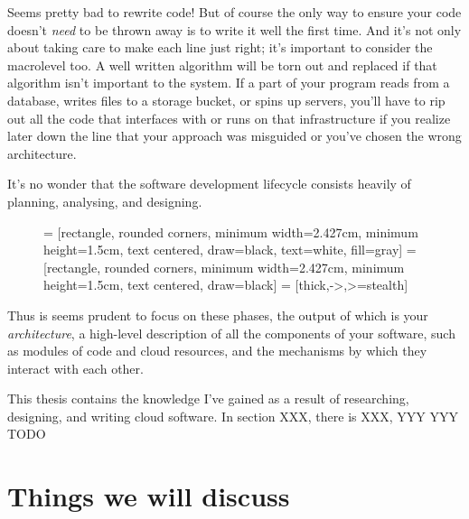 \documentclass{article}
\newcommand{\noterm}[1]{\textit{#1}}
\newcommand{\term}[1]{\noterm{#1}\index{#1}}
\begin{document}
Seems pretty bad to rewrite code!
But of course the only way to ensure your code doesn't \textit{need} to be thrown away is to write it well the first time.
And it's not only about taking care to make each line just right; it's important to consider the macrolevel too.
A well written algorithm will be torn out and replaced if that algorithm isn't important to the system.
If a part of your program reads from a database, writes files to a storage bucket, or spins up servers, you'll have to rip out all the code that interfaces with or runs on that infrastructure if you realize later down the line that your approach was misguided or you've chosen the wrong architecture.

It's no wonder that the software development lifecycle consists heavily of planning, analysing, and designing.

\begin{figure}[h]
  \centering
   = [rectangle, rounded corners, minimum width=2.427cm, minimum height=1.5cm, text centered, draw=black, text=white, fill=gray]
   = [rectangle, rounded corners, minimum width=2.427cm, minimum height=1.5cm, text centered, draw=black]
   = [thick,->,>=stealth]
  \label{fig:sdl}
\end{figure}

Thus is seems prudent to focus on these phases, the output of which is your \term{architecture}, a high-level description of all the components of your software, such as modules of code and cloud resources, and the mechanisms by which they interact with each other.

This thesis contains the knowledge I've gained as a result of researching, designing, and writing cloud software.
In section XXX, there is XXX, YYY YYY TODO

\section{Things we will discuss}
\end{document}
